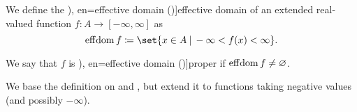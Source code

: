 \begin{definition}\label{def:effective_domain}\mimprovised
  We define the \term[ru=эффективное множество (\cite[50]{ПоловинкинБалашов2007ВыпуклыйАнализ}), en=effective domain (\cite[30]{Clarke2013OptimalControl})]{effective domain} of an extended real-valued function \( f: A \to [-\infty, \infty] \) as
  \begin{equation}\label{eq:def:effective_domain}
    \eff\dom f \coloneqq \set{ x \in A \given -\infty < f(x) < \infty }.
  \end{equation}

  We say that \( f \) is \term[ru=эффективное множество (\cite[50]{ПоловинкинБалашов2007ВыпуклыйАнализ}), en=effective domain (\cite[30]{Clarke2013OptimalControl})]{proper} if \( \operatorname*{eff\negthinspace\operatorname{dom}} f \neq \varnothing \).
\end{definition}
\begin{comments}
  \item We base the definition on \cite[30]{Clarke2013OptimalControl} and \cite[50]{ПоловинкинБалашов2007ВыпуклыйАнализ}, but extend it to functions taking negative values (and possibly \( -\infty \)).
\end{comments}

